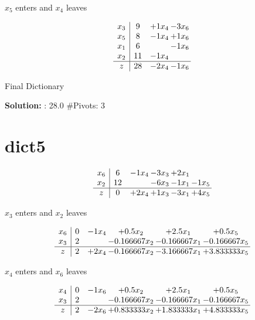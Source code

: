 \documentclass[10pt]{article}
\begin{document}
 $ x_{5} $ enters and $ x_{4} $ leaves 

 \[\begin{array}{c| c c@{\hskip 2pt} c@{\hskip 2pt} }
 x_{3}   &  9 & + 1  x_{4} & -3  x_{6}\\
 x_{5}   &  8 & -1  x_{4} & + 1  x_{6}\\
 x_{1}   &  6  &   & -1  x_{6}\\
 x_{2}   &  11 & -1  x_{4} &   \\
\hline
z    &  28 & -2  x_{4} & -1  x_{6}\\
\end{array}\]


 Final Dictionary
\par \noindent\textbf{Solution:} :  28.0
\#Pivots:  3
\section{dict5}

\[\begin{array}{c| c c@{\hskip 2pt} c@{\hskip 2pt} c@{\hskip 2pt} c@{\hskip 2pt} }
 x_{6}   &  6 & -1  x_{4} & -3  x_{3} & + 2  x_{1} &   \\
 x_{2}   &  12  &   & -6  x_{3} & -1  x_{1} & -1  x_{5}\\
\hline
z    &  0 & + 2  x_{4} & + 1  x_{3} & -3  x_{1} & + 4  x_{5}\\
\end{array}\]


 $ x_{3} $ enters and $ x_{2} $ leaves 

 \[\begin{array}{c| c c@{\hskip 2pt} c@{\hskip 2pt} c@{\hskip 2pt} c@{\hskip 2pt} }
 x_{6}   &  0 & -1  x_{4} & + 0.5 x_{2} & + 2.5 x_{1} & + 0.5 x_{5}\\
 x_{3}   &  2  &   & -0.166667 x_{2} & -0.166667 x_{1} & -0.166667 x_{5}\\
\hline
z    &  2 & + 2  x_{4} & -0.166667 x_{2} & -3.166667 x_{1} & + 3.833333 x_{5}\\
\end{array}\]


 $ x_{4} $ enters and $ x_{6} $ leaves 

 \[\begin{array}{c| c c@{\hskip 2pt} c@{\hskip 2pt} c@{\hskip 2pt} c@{\hskip 2pt} }
 x_{4}   &  0 & -1  x_{6} & + 0.5 x_{2} & + 2.5 x_{1} & + 0.5 x_{5}\\
 x_{3}   &  2  &   & -0.166667 x_{2} & -0.166667 x_{1} & -0.166667 x_{5}\\
\hline
z    &  2 & -2  x_{6} & + 0.833333 x_{2} & + 1.833333 x_{1} & + 4.833333 x_{5}\\
\end{array}\]
\end{document}

